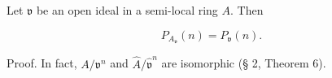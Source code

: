 Let $\mathfrak{v}$ be an open ideal in a semi-local ring $A$. Then

$$P_{A_{\mathfrak{v}}}(n) = P_{\mathfrak{v}}(n).$$

Proof. In fact, $A/\mathfrak{v}^n$ and $\hat{A}/\hat{\mathfrak{v}}^n$ are isomorphic (§ 2, Theorem 6).